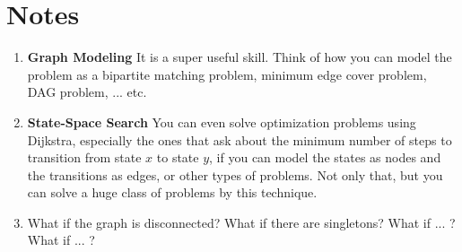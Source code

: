 \documentclass[12pt]{book}
\begin{document}
\section{Notes}
\begin{enumerate} [label = \roman*.]
\item \textbf{Graph Modeling} It is a super useful skill. Think of how you can model the problem as a bipartite matching problem, minimum edge cover problem, DAG problem, ... etc.
\item \textbf{State-Space Search} You can even solve optimization problems using Dijkstra, especially the ones that ask about the minimum number of steps to transition from state $x$ to state $y$, if you can model the states as nodes and the transitions as edges, or other types of problems. Not only that, but you can solve a huge class of problems by this technique.

\item What if the graph is disconnected? What if there are singletons? What if ... ? What if ... ?
\end{enumerate}
\end{document}
